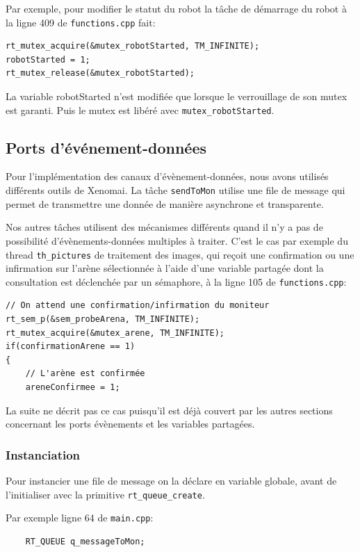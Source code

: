 \documentclass[11pt, a4paper]{paper}
\begin{document}
Par exemple, pour modifier le statut du robot la tâche de démarrage du robot à la ligne 409 de {\tt functions.cpp} fait:

\begin{verbatim}
rt_mutex_acquire(&mutex_robotStarted, TM_INFINITE);
robotStarted = 1;
rt_mutex_release(&mutex_robotStarted);
\end{verbatim}

La variable robotStarted n'est modifiée que lorsque le verrouillage de son mutex est garanti. Puis le mutex est libéré avec {\tt mutex\_robotStarted}.

\subsection{Ports d’événement-données}
Pour l'implémentation des canaux d'évènement-données, nous avons utilisés différents outils de Xenomai. La tâche {\tt sendToMon} utilise une file de message qui permet de transmettre une donnée de manière asynchrone et transparente.

Nos autres tâches utilisent des mécanismes différents quand il n'y a pas de possibilité d'évènements-données multiples à traiter. C'est le cas par exemple du thread {\tt th\_pictures} de traitement des images, qui reçoit une confirmation ou une infirmation sur l'arène sélectionnée à l'aide d'une variable partagée dont la consultation est déclenchée par un sémaphore, à la ligne 105 de {\tt functions.cpp}:

\begin{verbatim}
// On attend une confirmation/infirmation du moniteur
rt_sem_p(&sem_probeArena, TM_INFINITE);
rt_mutex_acquire(&mutex_arene, TM_INFINITE);
if(confirmationArene == 1)
{
    // L'arène est confirmée
    areneConfirmee = 1;
\end{verbatim}

La suite ne décrit pas ce cas puisqu'il est déjà couvert par les autres sections concernant les ports évènements et les variables partagées.

\subsubsection{Instanciation}
Pour instancier une file de message on la déclare en variable globale, avant de l'initialiser avec la primitive {\tt rt\_queue\_create}.

Par exemple ligne 64 de {\tt main.cpp}:
\begin{verbatim}
    RT_QUEUE q_messageToMon;
\end{verbatim}
\end{document}
